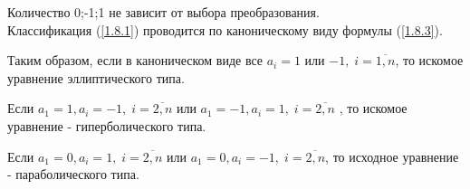 \documentclass[../main.tex]{subfiles}
\begin{document}
Количество 0;-1;1 не зависит от выбора преобразования. \\
Классификация (\ref{1.8.1}) проводится по каноническому виду формулы (\ref{1.8.3}). \\
\par Таким образом, если в каноническом виде все $a_i = 1$ или $-1, \; i=\overline{1,n}$, то искомое уравнение эллиптического типа. \\
\par Если $a_1 = 1, a_i = -1, \; i = \overline{2,n} $ или $a_1 = -1, a_i = 1, \; i = \overline{2,n}$ , то искомое уравнение - гиперболического типа. \\
\par Если $a_1 = 0, a_i = 1, \; i = \overline{2,n} $ или $a_1=0, a_i = -1, \; i = \overline{2,n}$, то исходное уравнение - параболического типа. \\
\end{document}
